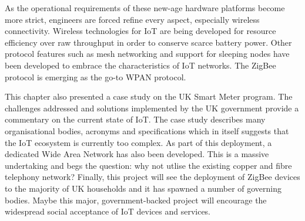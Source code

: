     As the operational requirements of these new-age hardware platforms become more strict, engineers are forced refine every aspect, especially wireless connectivity. Wireless technologies for IoT are being developed for resource efficiency over raw throughput in order to conserve scarce battery power. Other protocol features such as mesh networking and support for sleeping nodes have been developed to embrace the characteristics of IoT networks. The ZigBee protocol is emerging as the go-to WPAN protocol.

    This chapter also presented a case study on the UK Smart Meter program. The challenges addressed and solutions implemented by the UK government provide a commentary on the current state of IoT. The case study describes many organisational bodies, acronyms and specifications which in itself suggests that the IoT ecosystem is currently too complex. As part of this deployment, a dedicated Wide Area Network has also been developed. This is a massive undertaking and begs the question: why not utlise the existing copper and fibre telephony network? Finally, this project will see the deployment of ZigBee devices to the majority of UK households and it has spawned a number of governing bodies. Maybe this major, government-backed project will encourage the widespread social acceptance of IoT devices and services.
